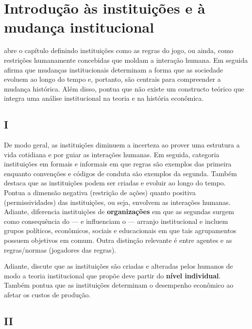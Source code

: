 \section{Introdução às instituições e à mudança institucional}

\autor abre o capítulo definindo instituições como as regras do jogo, ou ainda, como restrições humanamente concebidas que moldam a interação humana. Em seguida afirma que mudanças institucionais determinam a forma que as sociedade evoluem ao longo do tempo e, portanto, são centrais para compreender a mudança histórica. Além disso, pontua que não existe um constructo teórico que integra uma análise institucional na teoria e na história econômica.

\subsection{I}

De modo geral, as instituições diminuem a incerteza ao prover uma estrutura a vida cotidiana e por guiar as interações humanas. Em seguida, categoria instituições em formais e informais em que regras são exemplos das primeira enquanto convenções e códigos de conduta são exemplos da segunda. Também destaca que as instituições podem ser criadas e evoluir ao longo do tempo. Pontua a dimensão negativa (restrição de ações) quanto positiva (permissividades) das instituições, ou seja, envolvem as interações humanas. Adiante, diferencia instituições de \textbf{organizações} em que as segundas surgem como consequência do --- e influenciam o --- arranjo institucional e incluem grupos políticos, econômicos, sociais e educacionais em que tais agrupamentos possuem objetivos em comum.
Outra distinção relevante é entre agentes e as regras/normas (jogadores das regras).

Adiante, \autor discute que as instituições são criadas e alteradas pelos humanos de modo a teoria institucional que propõe deve partir do \textbf{nível individual}.
Também pontua que as instituições determinam o desempenho econômico ao afetar os custos de produção.

\subsection{II}

